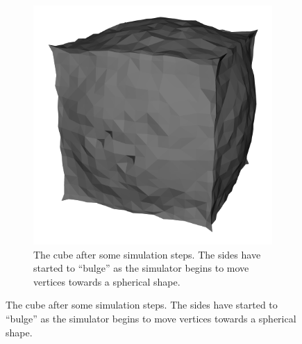 \begin{figure}
\begin{subfigure}[t]{0.4\textwidth}
                \includegraphics[width=\textwidth]{img/maya1.png}
                \caption{The cube after some simulation steps. The sides have
                         started to ``bulge'' as the simulator begins to move
                         vertices towards a spherical shape.}
                \label{fig:Maya1}
        \end{subfigure}


\end{figure}
